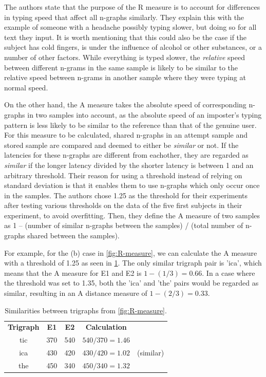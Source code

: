 \documentclass[informationsecurity]{gucmasterproject}
\begin{document}
The authors state that the purpose of the R measure is to account for differences in typing speed that affect all n-graphs similarly.
They explain this with the example of someone with a headache possibly typing slower, but doing so for all text they input.
It is worth mentioning that this could also be the case if the subject has cold fingers, is under the influence of alcohol or other substances, or a number of other factors.
While everything is typed slower, the \textit{relative} speed between different n-grams in the same sample is likely to be similar to the relative speed between n-grams in another sample where they were typing at normal speed.

On the other hand, the A measure takes the absolute speed of corresponding n-graphs in two samples into account, as the absolute speed of an imposter's typing pattern is less likely to be similar to the reference than that of the genuine user.
For this measure to be calculated, shared n-graphs in an attempt sample and stored sample are compared and deemed to either be \textit{similar} or not.
If the latencies for these n-graphs are different from eachother, they are regarded as \textit{similar} if the longer latency divided by the shorter latency is between 1 and an arbitrary threshold.
Their reason for using a threshold instead of relying on standard deviation is that it enables them to use n-graphs which only occur once in the samples.
The authors chose 1.25 as the threshold for their experiments after testing various thresholds on the data of the five first subjects in their experiment, to avoid overfitting.
Then, they define the A measure of two samples as 1 -- (number of similar n-graphs between the samples) / (total number of n-graphs shared between the samples).

For example, for the (b) case in \cref{fig:R-measure}, we can calculate the A measure with a threshold of 1.25 as seen in \cref{tab:gnp-similar}.
The only similar trigraph pair is 'ica', which means that the A measure for E1 and E2 is $1-(1/3)=0.66$.
In a case where the threshold was set to 1.35, both the 'ica' and 'the' pairs would be regarded as similar, resulting in an A distance measure of $1-(2/3)=0.33$.
\begin{table}[h]
\centering
\begin{tabular}{ccccc}
 \bf Trigraph & \bf E1 & \bf E2 & \bf Calculation &  \\
 tic & 370 & 540 & $540/370=1.46$ &  \\
 ica & 430 & 420 & $430/420=1.02$ & (similar) \\
 the & 450 & 340 & $450/340=1.32$ & 
\end{tabular}
\caption{Similarities between trigraphs from \cref{fig:R-measure}.}
\label{tab:gnp-similar}
\end{table}
\end{document}
